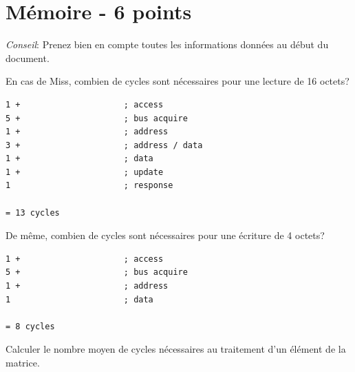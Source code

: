 %
%

\section{M\'emoire - 6 points}

\textit{Conseil}: Prenez bien en compte toutes les informations
donn\'ees au d\'ebut du document.

En cas de Miss, combien de cycles sont n\'ecessaires pour une lecture de
16 octets?

\begin{correction}

\begin{verbatim}
1 +                     ; access
5 +                     ; bus acquire
1 +                     ; address
3 +                     ; address / data
1 +                     ; data
1 +                     ; update
1                       ; response

= 13 cycles
\end{verbatim}

\end{correction}

De m\^eme, combien de cycles sont n\'ecessaires pour une \'ecriture de
4 octets?

\begin{correction}

\begin{verbatim}
1 +                     ; access
5 +                     ; bus acquire
1 +                     ; address
1                       ; data

= 8 cycles
\end{verbatim}

\end{correction}

Calculer le nombre moyen de cycles n\'ecessaires au traitement d'un
\'el\'ement de la matrice.

